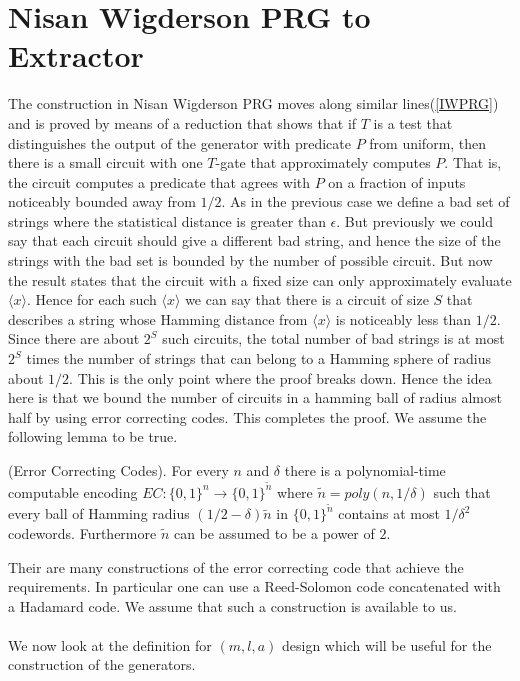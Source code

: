 \section{Nisan Wigderson PRG to Extractor}
\label{proof_fail} 
The construction in Nisan Wigderson PRG \cite{Nisan:1994:HVR:192095.192097} moves along similar lines(\ref{IWPRG}) and is proved by means of a reduction that shows that if $T$ is a test that distinguishes the output of the generator with predicate $P$ from uniform, then there is a small circuit with one $T$-gate that approximately computes $P$. That is, the circuit computes a predicate that agrees with $P$ on a fraction of inputs noticeably bounded away from $1/2$. As in the previous case we define a bad set of strings where the statistical distance is greater than $\epsilon$. But previously we could say that each circuit should give a different bad string, and hence the size of the strings with the bad set is bounded by the number of possible circuit. But now the result states that the circuit with a fixed size can only approximately evaluate $\langle x \rangle$. Hence for each such $\langle x \rangle$ we can say that there is a circuit of size $S$ that describes a string whose Hamming distance from $\langle x \rangle$ is noticeably less than $1/2$. Since there are about $2^S$ such circuits, the total number of bad strings is at most $2^S$ times the number of strings that can belong to a Hamming sphere of radius about $1/2$. This is the only point where the proof breaks down. Hence the idea here is that we bound the number of circuits in a hamming ball of radius almost half by using error correcting codes. This completes the proof. We assume the following lemma to be true.
\begin{lemma}
(Error Correcting Codes). For every $n$ and $\delta$ there is a polynomial-time computable encoding $EC : \{0,1\}^n \rightarrow \{0, 1\}^{\tilde{n}}$ where $\tilde{n}= poly(n, 1/\delta)$ such that every ball of Hamming radius $(1/2 - \delta)\tilde{n}$ in $\{0, 1\}^{\tilde{n}}$ contains at most $1/{\delta^2}$ codewords. Furthermore $\tilde{n}$ can be assumed to be a power of $2$.
\label{ECcode}
\end{lemma}
Their are many constructions of the error correcting code that achieve the requirements. In particular one can use a Reed-Solomon code concatenated with a Hadamard code. We assume that such a construction is available to us.
\\~\\
We now look at the definition for $(m,l,a)$ design which will be useful for the construction of the generators.
